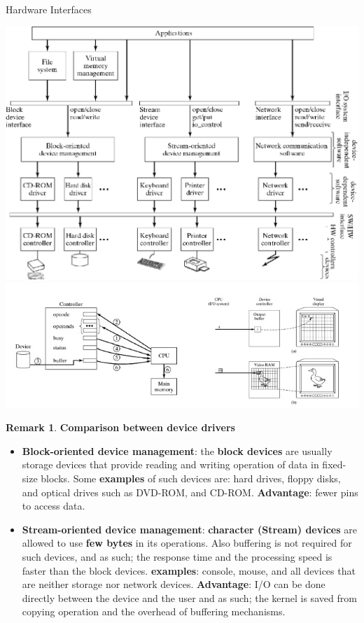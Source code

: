 \documentclass[12pt,a4paper]{article}
\theoremstyle{definition}
\newtheorem*{remark}{Remark}
\newenvironment{myitemize}
{ \begin{itemize}
    \setlength{\itemsep}{5pt}
    \setlength{\parskip}{0pt}
    \setlength{\parsep}{0pt}     }
{ \end{itemize}                  }
\begin{document}
\begin{tcolorbox}
	\textsf{Hardware Interfaces}
	
	\includegraphics[scale=0.3]{m1/hardwareDevice}
	\centering
	\includegraphics[scale=0.4]{m1/hardwareController}
	\centering
\end{tcolorbox}

\begin{remark}{\textbf{Comparison between device drivers}}
	\begin{myitemize}
		\item \textbf{Block-oriented device management}: the \textbf{block devices} are usually storage devices that provide reading and writing operation of data in fixed-size blocks. Some \textbf{examples} of such devices are: hard drives, floppy disks, and optical drives such as DVD-ROM, and CD-ROM. \textbf{Advantage}: fewer pins to access data.
		\item \textbf{Stream-oriented device management}: \textbf{character (Stream) devices} are allowed to use \textbf{few bytes} in its operations. Also buffering is not required for such devices, and as such; the response time and the processing speed is faster than the block devices. \textbf{examples}: console, mouse, and all devices that are neither storage nor network devices. \textbf{Advantage}: I/O can be done directly between the device and the user and as such; the kernel is saved from copying operation and the overhead of buffering mechanisms.
	\end{myitemize}
\end{remark}
\end{document}
